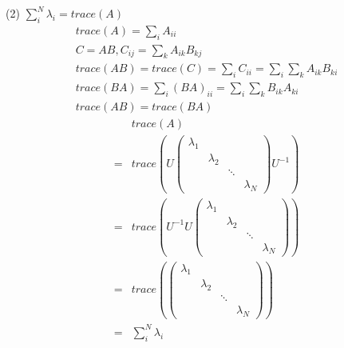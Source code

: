 (2) $\sum_{i}^{N} \lambda_{i}=trace(A)$
\begin{gather}
    trace(A)=\sum_{i}A_{ii}\\
    C=AB, C_{ij}=\sum_{k}A_{ik}B_{kj}\\
    trace(AB)=trace(C)=\sum_{i}C_{ii}=\sum_{i} \sum_{k}A_{ik}B_{ki}\\
    trace(BA)=\sum_{i} (BA)_{ii} = \sum_{i} \sum_{k} B_{ik}A_{ki}\\
    trace(AB)=trace(BA)
\end{gather}
\begin{align}
    &trace(A)\\
    =&trace(U
    \begin{pmatrix}
        \lambda_{1} &  &  & \\
         & \lambda_{2} &  & \\
         &  & \ddots & \\
         &  &  & \lambda_{N}
    \end{pmatrix}
    U^{-1})\\
    =&trace(U^{-1}U
    \begin{pmatrix}
        \lambda_{1} &  &  & \\
         & \lambda_{2} &  & \\
         &  & \ddots & \\
         &  &  & \lambda_{N}
    \end{pmatrix}
    )\\
    =&trace(
    \begin{pmatrix}
        \lambda_{1} &  &  & \\
         & \lambda_{2} &  & \\
         &  & \ddots & \\
         &  &  & \lambda_{N}
    \end{pmatrix}    
    )\\
    =&\sum_{i}^{N} \lambda_{i}
\end{align}
